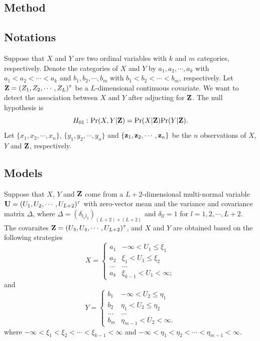 \documentclass[a4,11pt,epsf, amssymb]{article}
\begin{document}
\begin{CJK}{GBK}{song}
\section{Method}

\subsection{Notations}
Suppose that $X$ and $Y$ are two ordinal variables with $k$ and $m$ categories, respectively. Denote the categories of $X$ and $Y$ by $a_1,a_2,\cdots,a_k$ with $a_1<a_2<\cdots<a_k$
and $b_1,b_2,\cdots,b_m$ with $b_1<b_2<\cdots<b_m$, respectively. Let ${\bf Z}=(Z_1,Z_2,\cdots,Z_L)^\tau$ be a $L$-dimensional continuous covariate. We want to detect the association between $X$ and $Y$ after adjucting for ${\bf Z}$.
The null hypothesis is
$$H_{01}:\hbox{Pr}(X,Y|{\bf Z})=\hbox{Pr}(X|{\bf Z})\hbox{Pr}(Y|{\bf Z}).$$
Let $\{x_1,x_2,\cdots,x_n\}$, $\{y_1,y_2,\cdots,y_n\}$ and $\{{\bf z}_1,{\bf z}_2,\cdots,{\bf z}_n\}$ be the $n$ observations of $X$, $Y$ and ${\bf Z}$, respectively.

\subsection{Models}
Suppose that $X$, $Y$ and ${\bf Z}$ come from a $L+2$-dimensional multi-normal variable ${\bf U}=(U_1,U_2,\cdots,U_{L+2})^\tau$ with zero-vector mean and the variance and covariance matrix $\Delta$, where
$\Delta=(\delta_{l_1l_2})_{(L+2)\times(L+2)}$ and $\delta_{ll}=1$ for $l=1,2,\cdots,L+2$. The covaraites ${\bf Z}=(U_3,U_4,\cdots,U_{L+2})^\tau$, and $X$ and $Y$ are obtained based on the following strategies
$$
X=\left\{\begin{array}{ll}
a_1 & -\infty < U_1 \leq \xi_1\\
a_2 & \xi_1 < U_1 \leq \xi_2\\
\ldots & \ldots\\
a_k & \xi_{k-1} < U_1<\infty;
\end{array}\right.
$$
and
$$
Y=\left\{\begin{array}{ll}
b_1 & -\infty < U_2 \leq \eta_1\\
b_2 & \eta_1 < U_2 \leq \eta_2\\
\ldots & \ldots\\
b_m & \eta_{m-1} < U_2< \infty.
\end{array}\right.
$$
where $-\infty<\xi_1<\xi_2<\cdots<\xi_{k-1}<\infty$ and $-\infty<\eta_1<\eta_2<\cdots<\eta_{m-1}<\infty$.



\end{CJK}
\end{document}
